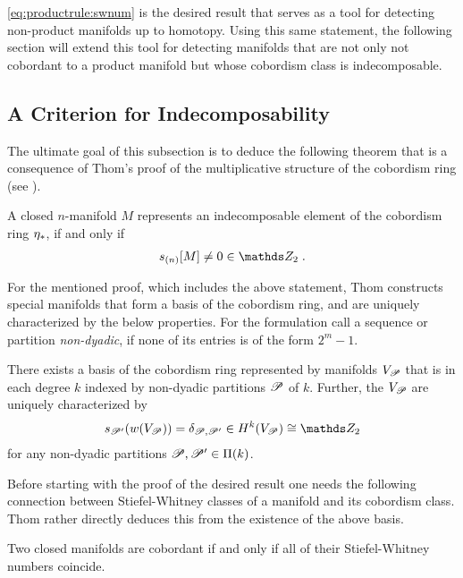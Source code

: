 \autoref{eq:productrule:swnum} is the desired result that serves as a
tool for detecting non-product manifolds up to homotopy.
Using this same statement, the following section will extend this tool
for detecting manifolds that are not only not cobordant to a product
manifold but whose cobordism class is indecomposable.


\subsection{A Criterion for Indecomposability}

The ultimate goal of this subsection is to deduce the following
theorem that is a consequence of Thom's proof of the multiplicative
structure of the cobordism ring (see \cite[Section~IV.5]{thom}).
\begin{Thm}\label{thm:indecomposabilitycriterion}
  A closed $n$-manifold $M$ represents an indecomposable element of
  the cobordism ring $\eta_*$, if and only if
  \begin{gather*}
    \snum{(n)}{M} \neq 0 \in \Zmod2
    \;.
  \end{gather*}
\end{Thm}

For the mentioned proof, which includes the above statement, Thom
constructs special manifolds that form a basis of the cobordism ring,
and are uniquely characterized by the below properties.
For the formulation call a sequence or partition \emph{non-dyadic}, if
none of its entries is of the form $2^m-1$. 
\begin{Thm}\label{thm:basiscobordismring} %
  There exists a basis of the cobordism ring represented by manifolds
  $V_{\mathscr{P}}$ that is in each degree $k$ indexed by non-dyadic
  partitions $\mathscr{P}$ of $k$. Further, the $V_{\mathscr{P}}$ are uniquely
  characterized by
  \begin{gather*}
    \s{\Part'}(\W{V_\Part}) = \delta_{\Part,\Part'}
    \in \H^k(V_{\Part})\cong \Zmod2
  \end{gather*}
  for any non-dyadic partitions $\mathscr{P},\mathscr{P}'\in\Pi({k})$.
\end{Thm}

Before starting with the proof of the desired result one needs the
following connection between Stiefel-Whitney classes of a manifold and
its cobordism class. Thom rather directly deduces this from the
existence of the above basis.
\begin{Thm}[Thom]\label{thm:cobordantiffswnumscoincide}
  Two closed manifolds are cobordant if and only if all of their
  Stiefel-Whitney numbers coincide.
\end{Thm}

